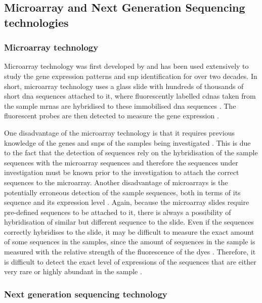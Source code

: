 \subsection{Microarray and Next Generation Sequencing technologies}
\label{sub:microarray_and_next_generation_sequencing_technologies}

\subsubsection{Microarray technology}
\label{ssub:microarray_technology}

Microarray technology was first developed by \citet{Schena1995} and has been used extensively to study the gene expression patterns and \gls{snp} identification for over two decades.
In short, microarray technology uses a glass slide with hundreds of thousands of short \acrshort{dna} sequences attached to it, where fluorescently labelled \glspl{cdna} taken from the sample \glspl{mrna} are hybridised to these immobilised \acrshort{dna} sequences \citep{Schena1995,Schulze2001}.
The fluorescent probes are then detected to measure the gene expression \citep{Schena1995,Schulze2001}.

One disadvantage of the microarray technology is that it requires previous knowledge of the genes and \glspl{snp} of the samples being investigated \citep{Hurd2009}.
This is due to the fact that the detection of sequences rely on the hybridisation of the sample sequences with the microarray sequences and therefore the sequences under investigation must be known prior to the investigation to attach the correct sequences to the microarray.
Another disadvantage of microarrays is the potentially erroneous detection of the sample sequences, both in terms of its sequence and its expression level \citep{Hurd2009}.
Again, because the microarray slides require pre-defined sequences to be attached to it, there is always a possibility of hybridisation of similar but different sequence to the slide.
Even if the sequences correctly hybridises to the slide, it may be difficult to measure the exact amount of some sequences in the samples, since the amount of sequences in the sample is measured with the relative strength of the fluorescence of the dyes \citep{Hurd2009}.
Therefore, it is difficult to detect the exact level of expressions of the sequences that are either very rare or highly abundant in the sample \citep{Hurd2009}.

\subsubsection{Next generation sequencing technology}
\label{ssub:next_generation_sequencing_technology}


